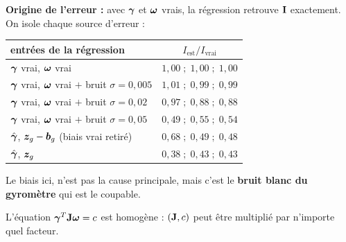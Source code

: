 \textbf{Origine de l'erreur : } avec $\bm{\gamma}$ et $\bm{\omega}$ vrais, la régression retrouve $\mathbf{I}$ exactement. On isole chaque source d'erreur :
\begin{center}
\begin{tabular}{|l|c|}
    \hline
    entrées de la régression & $I_{\text{est}}/I_{\text{vrai}}$ \\
    \hline
    $\bm{\gamma}$ vrai, $\bm{\omega}$ vrai & $1{,}00 \;;\; 1{,}00 \;;\; 1{,}00$ \\
    $\bm{\gamma}$ vrai, $\bm{\omega}$ vrai $+$ bruit $\sigma = 0{,}005$ & $1{,}01 \;;\; 0{,}99 \;;\; 0{,}99$ \\
    $\bm{\gamma}$ vrai, $\bm{\omega}$ vrai $+$ bruit $\sigma = 0{,}02$ & $0{,}97 \;;\; 0{,}88 \;;\; 0{,}88$ \\
    $\bm{\gamma}$ vrai, $\bm{\omega}$ vrai $+$ bruit $\sigma = 0{,}05$ & $0{,}49 \;;\; 0{,}55 \;;\; 0{,}54$ \\
    $\hat{\bm{\gamma}}$, $\bm{z}_g - \bm{b}_g$ (biais vrai retiré) & $0{,}68 \;;\; 0{,}49 \;;\; 0{,}48$ \\
    $\hat{\bm{\gamma}}$, $\bm{z}_g$ & $0{,}38 \;;\; 0{,}43 \;;\; 0{,}43$ \\
    \hline
\end{tabular}
\end{center}
Le biais ici, n'est pas la cause principale, mais c'est le \textbf{bruit blanc du gyromètre} qui est le coupable.

\begin{remarque}
    L'équation $\bm{\gamma}^T\mathbf{J}\bm{\omega} = c$ est homogène : $(\mathbf{J}, c)$ peut être multiplié par n'importe quel facteur.
\end{remarque}


